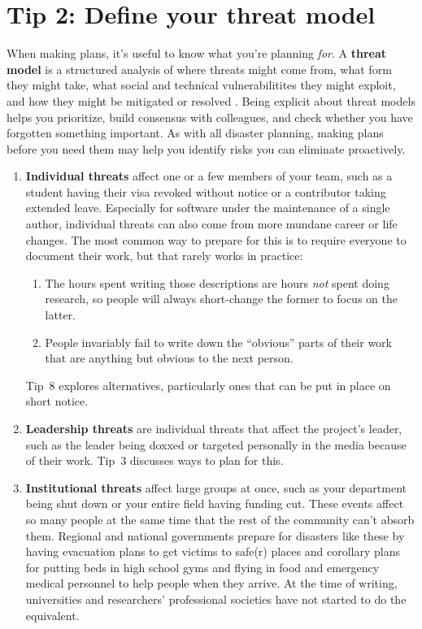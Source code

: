 \documentclass[10pt,letterpaper]{article}
\begin{document}
\section*{Tip 2: Define your threat model}

When making plans, it's useful to know what you're planning \emph{for}.
A \textbf{threat model} is a structured analysis of where threats might come from,
what form they might take,
what social and technical vulnerabilitites they might exploit,
and how they might be mitigated or resolved \cite{Torr2005}.
Being explicit about threat models helps you prioritize,
build consensus with colleagues,
and check whether you have forgotten something important.
As with all disaster planning,
making plans before you need them may help you identify risks you can eliminate proactively.

\begin{enumerate}
\item
  \textbf{Individual threats} affect one or a few members of your team,
  such as a student having their visa revoked without notice
  or a contributor taking extended leave.
  Especially for software under the maintenance of a single author,
  individual threats can also come from more mundane career or life changes.
  The most common way to prepare for this is to require everyone to document their work,
  but that rarely works in practice:
  \begin{enumerate}
  \item
    The hours spent writing those descriptions are hours \emph{not} spent doing research,
    so people will always short-change the former to focus on the latter.
  \item
    People invariably fail to write down the ``obvious'' parts of their work
    that are anything but obvious to the next person.
  \end{enumerate}
  Tip~8 explores alternatives,
  particularly ones that can be put in place on short notice.

\item
  \textbf{Leadership threats} are individual threats that affect the project's leader,
  such as the leader being doxxed or targeted personally in the media because of their work.
  Tip~3 discusses ways to plan for this.

\item
  \textbf{Institutional threats} affect large groups at once,
  such as your department being shut down
  or your entire field having funding cut.
  These events affect so many people at the same time
  that the rest of the community can't absorb them.
  Regional and national governments prepare for disasters like these
  by having evacuation plans to get victims to safe(r) places
  and corollary plans for putting beds in high school gyms
  and flying in food and emergency medical personnel to help people when they arrive.
  At the time of writing,
  universities and researchers' professional societies have not started to do the equivalent.


\end{enumerate}
\end{document}
